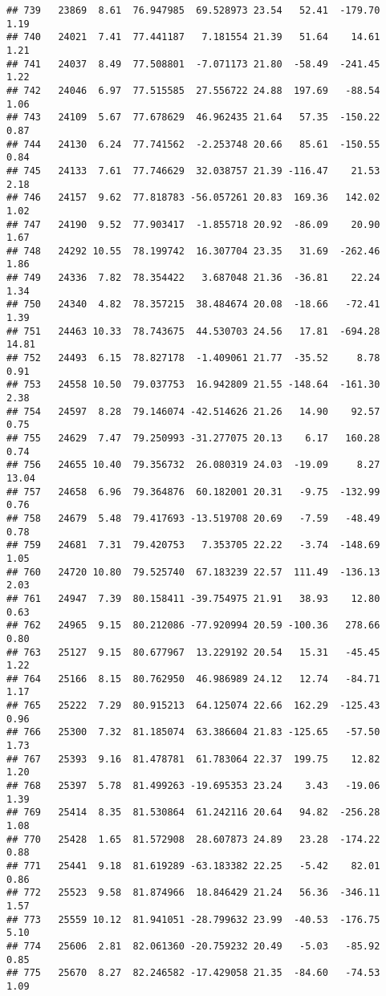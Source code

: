 \documentclass[]{article}
\begin{document}
\begin{verbatim}
## 739   23869  8.61  76.947985  69.528973 23.54   52.41  -179.70  1.19
## 740   24021  7.41  77.441187   7.181554 21.39   51.64    14.61  1.21
## 741   24037  8.49  77.508801  -7.071173 21.80  -58.49  -241.45  1.22
## 742   24046  6.97  77.515585  27.556722 24.88  197.69   -88.54  1.06
## 743   24109  5.67  77.678629  46.962435 21.64   57.35  -150.22  0.87
## 744   24130  6.24  77.741562  -2.253748 20.66   85.61  -150.55  0.84
## 745   24133  7.61  77.746629  32.038757 21.39 -116.47    21.53  2.18
## 746   24157  9.62  77.818783 -56.057261 20.83  169.36   142.02  1.02
## 747   24190  9.52  77.903417  -1.855718 20.92  -86.09    20.90  1.67
## 748   24292 10.55  78.199742  16.307704 23.35   31.69  -262.46  1.86
## 749   24336  7.82  78.354422   3.687048 21.36  -36.81    22.24  1.34
## 750   24340  4.82  78.357215  38.484674 20.08  -18.66   -72.41  1.39
## 751   24463 10.33  78.743675  44.530703 24.56   17.81  -694.28 14.81
## 752   24493  6.15  78.827178  -1.409061 21.77  -35.52     8.78  0.91
## 753   24558 10.50  79.037753  16.942809 21.55 -148.64  -161.30  2.38
## 754   24597  8.28  79.146074 -42.514626 21.26   14.90    92.57  0.75
## 755   24629  7.47  79.250993 -31.277075 20.13    6.17   160.28  0.74
## 756   24655 10.40  79.356732  26.080319 24.03  -19.09     8.27 13.04
## 757   24658  6.96  79.364876  60.182001 20.31   -9.75  -132.99  0.76
## 758   24679  5.48  79.417693 -13.519708 20.69   -7.59   -48.49  0.78
## 759   24681  7.31  79.420753   7.353705 22.22   -3.74  -148.69  1.05
## 760   24720 10.80  79.525740  67.183239 22.57  111.49  -136.13  2.03
## 761   24947  7.39  80.158411 -39.754975 21.91   38.93    12.80  0.63
## 762   24965  9.15  80.212086 -77.920994 20.59 -100.36   278.66  0.80
## 763   25127  9.15  80.677967  13.229192 20.54   15.31   -45.45  1.22
## 764   25166  8.15  80.762950  46.986989 24.12   12.74   -84.71  1.17
## 765   25222  7.29  80.915213  64.125074 22.66  162.29  -125.43  0.96
## 766   25300  7.32  81.185074  63.386604 21.83 -125.65   -57.50  1.73
## 767   25393  9.16  81.478781  61.783064 22.37  199.75    12.82  1.20
## 768   25397  5.78  81.499263 -19.695353 23.24    3.43   -19.06  1.39
## 769   25414  8.35  81.530864  61.242116 20.64   94.82  -256.28  1.08
## 770   25428  1.65  81.572908  28.607873 24.89   23.28  -174.22  0.88
## 771   25441  9.18  81.619289 -63.183382 22.25   -5.42    82.01  0.86
## 772   25523  9.58  81.874966  18.846429 21.24   56.36  -346.11  1.57
## 773   25559 10.12  81.941051 -28.799632 23.99  -40.53  -176.75  5.10
## 774   25606  2.81  82.061360 -20.759232 20.49   -5.03   -85.92  0.85
## 775   25670  8.27  82.246582 -17.429058 21.35  -84.60   -74.53  1.09

\end{verbatim}
\end{document}
